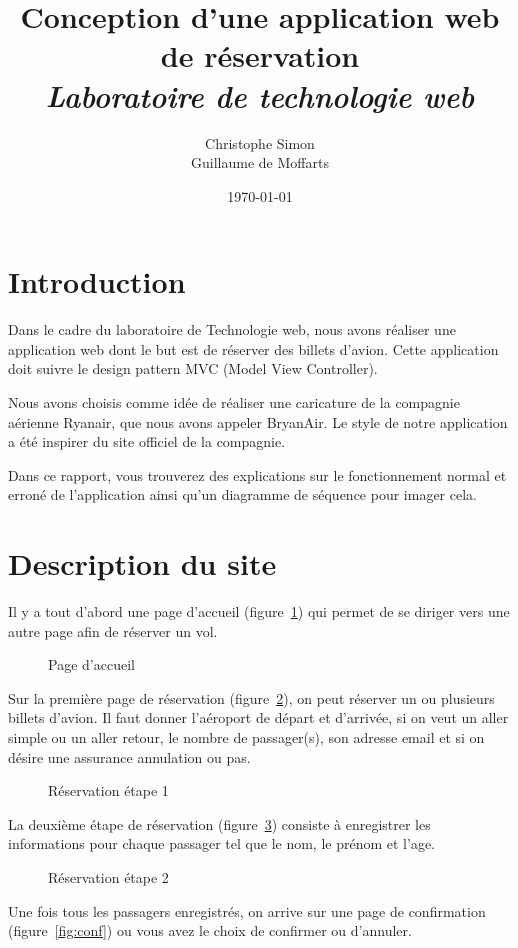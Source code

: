 \documentclass[12pt,a4paper]{article}
\title{Conception d'une application web de réservation\\[3mm] \normalsize{\it Laboratoire de technologie web}}
\author{Christophe Simon \\ Guillaume de Moffarts}
\date{\today}
\begin{document}
	\maketitle
	\section*{Introduction}
		Dans le cadre du laboratoire de Technologie web, nous avons réaliser une application web dont le but est de réserver des billets d'avion. Cette application doit suivre le design pattern MVC (Model View Controller).

		Nous avons choisis comme idée de réaliser une caricature de la compagnie aérienne Ryanair, que nous avons appeler BryanAir. Le style de notre application a été inspirer du site officiel de la compagnie.

		Dans ce rapport, vous trouverez des explications sur le fonctionnement normal et erroné de l'application ainsi qu'un diagramme de séquence pour imager cela.


	\section{Description du site}
		Il y a tout d'abord une page d'accueil (figure~\ref{fig:home}) qui permet de se diriger vers une autre page afin de réserver un vol.
		\begin{figure}
			\caption{Page d'accueil}
			\label{fig:home}
		\end{figure}

		Sur la première page de réservation (figure~\ref{fig:res1}), on peut réserver un ou plusieurs billets d'avion. Il faut donner l'aéroport de départ et d'arrivée, si on veut un aller simple ou un aller retour, le nombre de passager(s), son adresse email et si on désire une assurance annulation ou pas.
		\begin{figure}
			\caption{Réservation étape 1}
			\label{fig:res1}
		\end{figure}

		La deuxième étape de réservation (figure~\ref{fig:res2}) consiste à enregistrer les informations pour chaque passager tel que le nom, le prénom et l'age.
		\begin{figure}
			\caption{Réservation étape 2}
			\label{fig:res2}
		\end{figure}

		Une fois tous les passagers enregistrés, on arrive sur une page de confirmation (figure~\ref{fig:conf}) ou vous avez le choix de confirmer ou d'annuler.
\end{document}
